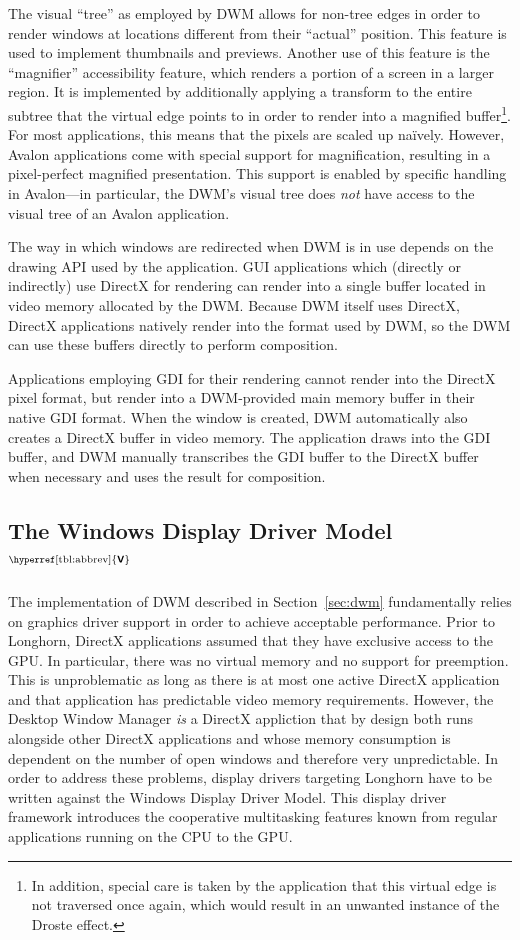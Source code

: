 \documentclass[10pt,twocolumn,a4paper]{article}
\newcommand{\bs}[1]{\textbf{\sffamily #1}}
\newcommand{\winver}[1]{$^{\text{\hyperref[tbl:abbrev]{\bs{#1}}}}$}
\newcommand{\winsubsection}[2]{\subsection[#1]{#1\winver{#2}}}
\begin{document}
			The visual \enquote{tree} as employed by DWM allows for non-tree edges
			in order to render windows at locations different from their \enquote{actual}
			position. This feature is used to implement thumbnails and previews.
			Another use of this feature is the \enquote{magnifier} accessibility
			feature, which renders a portion of a screen in a larger region.
			It is implemented by additionally applying a transform to the entire
			subtree that the virtual edge points to in order to render into a
			magnified buffer\footnote{In addition, special care is taken by the
			application
			that this virtual edge is not traversed once again, which would result
			in an unwanted instance of the Droste effect.}.
			For most applications, this means that the pixels are scaled up naïvely.
			However, Avalon applications come with special support for magnification,
			resulting in a pixel-perfect magnified presentation. This support
			is enabled by specific handling in Avalon---in particular, the DWM's
			visual tree does \emph{not} have access to the visual tree of an
			Avalon application.
			\cite{goingdeep}

			The way in which windows are redirected when DWM is in use depends
			on the drawing API used by the application. GUI applications which
			(directly or indirectly)
			use DirectX for rendering can render into a single buffer located
			in video memory allocated
			by the DWM. Because DWM itself uses DirectX, DirectX applications
			natively render into the format used by DWM, so the DWM can use
			these buffers directly to perform composition.
			\cite{dwmredirect}

			Applications employing GDI for their rendering cannot render into
			the DirectX pixel format, but render into a DWM-provided main memory
			buffer in their native GDI format. When the window is created, DWM
			automatically also creates a DirectX buffer in video memory. The
			application draws into the GDI buffer, and DWM manually transcribes
			the GDI buffer to the DirectX buffer when necessary and uses the result
			for composition.
			\cite{dwmredirect}

		\winsubsection{The Windows Display Driver Mo\-del}{V}\label{sec:wddm}
			The implementation of DWM described in Section~\ref{sec:dwm}
			fundamentally relies on graphics driver support in order to achieve
			acceptable performance.  Prior to Longhorn, DirectX applications
			assumed that they have exclusive access to the GPU. In particular,
			there was no virtual memory and no support for preemption. This is
			unproblematic as long as there is at most one active DirectX application
			and that application has predictable video memory requirements.
			However, the Desktop Window Manager \emph{is} a DirectX appliction that
			by design both runs alongside other DirectX applications and whose
			memory consumption is dependent on the number of open windows and therefore
			very unpredictable.
			In order to address these problems, display drivers targeting Longhorn
			have to be written against the Windows Display Driver Model. This
			display driver framework introduces the cooperative multitasking
			features known from regular applications running on the CPU to the
			GPU. \cite{dwmwddm}
\end{document}
